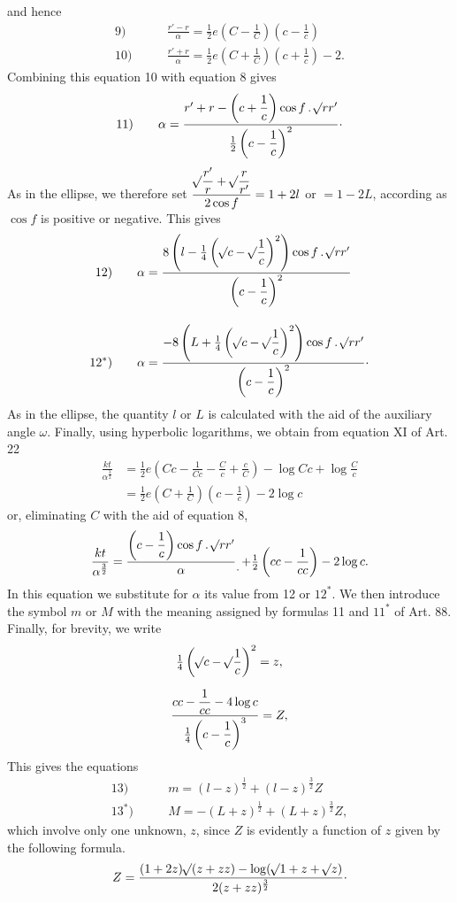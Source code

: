 \noindent and hence
\[
\begin{aligned}
\mathrm{9)}\qquad&\frac{r'-r}\alpha=\tfrac12e\left(C-\frac1C\right)\left(c-\frac1c\right)\\[.6em]
\mathrm{10)}\qquad&\frac{r'+r}\alpha=\tfrac12e\left(C+\frac1C\right)\left(c+\frac1c\right)-2.
\end{aligned}
\]
\noindent Combining this equation 10 with equation 8 gives
\[
\mathrm{11)}\qquad\alpha=\frac{r'+r-\left(c+\dfrac1c\right)\cos f\,\mathpunct{.}\mathord{{}^{}\!\surd}rr'}{\tfrac12\left(c-\dfrac1c\right)^2}\mathpunct{\cdot}
\]
\noindent As in the ellipse, we therefore set $\dfrac{\mathord{{}^{}\!\surd}\dfrac{r'}r+\mathord{{}^{}\!\surd}\dfrac r{r'}}{2\cos f}=1+2l$ or $=1-2L$, according as $\cos f$ is positive or negative. This gives
\[
\begin{aligned}
\mathrm{12)}\qquad&\alpha=\frac{8\left(l-\tfrac14\left(\mathord{{}^{}\!\surd}c-\mathord{{}^{}\!\surd}\dfrac1c\right)^2\right)\cos f\,\mathpunct{.}\mathord{{}^{}\!\surd}rr'}{\left(c-\dfrac1c\right)^2}\\[1em]
\mathrm{12^*)}\qquad&\alpha=\frac{-8\left(L+\tfrac14\left(\mathord{{}^{}\!\surd}c-\mathord{{}^{}\!\surd}\dfrac1c\right)^2\right)\cos f\,\mathpunct{.}\mathord{{}^{}\!\surd}rr'}{\left(c-\dfrac1c\right)^2}\mathpunct{\cdot}
\end{aligned}
\]
\noindent As in the ellipse, the quantity $l$ or $L$ is calculated with the aid of the auxiliary angle $\omega$. Finally, using hyperbolic logarithms, we obtain from equation XI of Art. 22
\[
\begin{aligned}
\frac{kt}{\alpha^{\frac32}}&=\tfrac12e\left(Cc-\frac1{Cc}-\frac Cc+\frac cC\right)-\log Cc+\log\frac Cc\\[.6em]
&=\tfrac12e\left(C+\frac1C\right)\left(c-\frac1c\right)-2\log c
\end{aligned}
\]
\noindent or, eliminating $C$ with the aid of equation 8,
\[
\frac{kt}{\alpha^{\frac32}}=\frac{\left(c-\dfrac1c\right)\cos f\,\mathpunct{.}\BareRoot{rr'}}\alpha\mathpunct{\raisebox{-1ex}{.}}+\tfrac12\left(cc-\frac1{cc}\right)-2\log c.
\]
\noindent In this equation we substitute for $\alpha$ its value from 12 or $12^*$. We then introduce the symbol $m$ or $M$ with the meaning assigned by formulas 11 and $11^*$ of Art. 88. Finally, for brevity, we write
\[
\begin{gathered}
\tfrac14\left(\mathord{{}^{}\!\surd}c-\mathord{{}^{}\!\surd}\frac1c\right)^2=z,\\[.6em]
\frac{cc-\dfrac1{cc}-4\log c}{\tfrac14\left(c-\dfrac1c\right)^3}=Z,
\end{gathered}
\]
\noindent This gives the equations
\[
\begin{aligned}
\mathrm{13)}\qquad&m=(l-z)^{\frac12}+(l-z)^{\frac32}Z\\[.6em]
\mathrm{13^*)}\qquad&M=-(L+z)^{\frac12}+(L+z)^{\frac32}Z,
\end{aligned}
\]
\noindent which involve only one unknown, $z$, since $Z$ is evidently a function of $z$ given by the following formula.
\[
Z=\frac{(1+2z)\mathord{{}^{}\!\surd}(z+zz)-\log(\mathord{{}^{}\!\surd}1+z+\mathord{{}^{}\!\surd}z)}{2(z+zz)^{\frac32}}\mathpunct{\cdot}
\]
